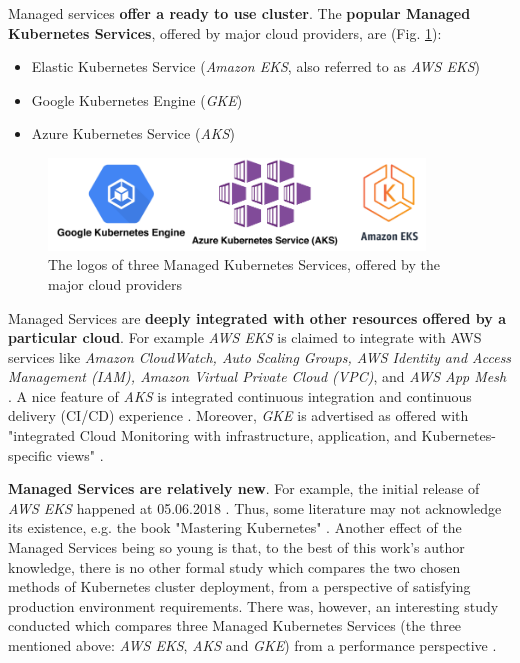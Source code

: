 Managed services \textbf{offer a ready to use cluster}. The \textbf{popular Managed Kubernetes Services}, offered by major cloud providers, are (Fig. \ref{fig:ms}):
\begin{itemize}
\item Elastic Kubernetes Service (\textit{Amazon EKS}, also referred to as \textit{AWS EKS}) \cite{online-eks}
\item Google Kubernetes Engine (\textit{GKE}) \cite{online-gke}
\item Azure Kubernetes Service (\textit{AKS}) \cite{online-aks}
\end{itemize}

\begin{figure}[H]
    \centering
    \includegraphics[width=10cm]{figures/managed-k8s.png}
    \captionsetup{justification=centering,margin=2cm}
    \caption{The logos of three Managed Kubernetes Services, offered by the major cloud providers}
    \label{fig:ms}
\end{figure}

Managed Services are \textbf{deeply integrated with other resources offered by a particular cloud}. For example \textit{AWS EKS} is claimed to integrate with AWS services like \textit{Amazon CloudWatch, Auto Scaling Groups, AWS Identity and Access Management (IAM), Amazon Virtual Private Cloud (VPC)}, and \textit{AWS App Mesh} \cite{online-eks}. A nice feature of \textit{AKS} is integrated continuous integration and continuous delivery (CI/CD) experience \cite{online-aks}. Moreover, \textit{GKE} is advertised as offered with "integrated Cloud Monitoring with infrastructure, application, and Kubernetes-specific views" \cite{online-gke}.

\textbf{Managed Services are relatively new}. For example, the initial release of \textit{AWS EKS} happened at 05.06.2018 \cite{eks-history}. Thus, some literature may not acknowledge its existence, e.g. the book "Mastering Kubernetes" \cite{book-mastering-k8s}. Another effect of the Managed Services being so young is that, to the best of this work's author knowledge, there is no other formal study which compares the two chosen methods of Kubernetes cluster deployment, from a perspective of satisfying production environment requirements. There was, however, an interesting study conducted which compares three Managed Kubernetes Services (the three mentioned above: \textit{AWS EKS}, \textit{AKS} and \textit{GKE}) from a performance perspective \cite{article-managed}.


